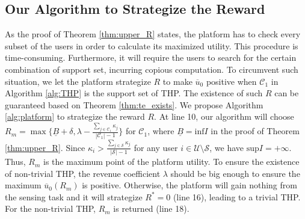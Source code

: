 \documentclass{IEEEtran}
\begin{document}
\subsection{Our Algorithm to Strategize the Reward}
As the proof of Theorem \ref{thm:upper_R} states, the platform has to check every subset of the users in order to calculate its maximized utility. This procedure is time-consuming. Furthermore, it will require the users to search for the certain combination of support set, incurring copious computation. To circumvent such situation, we let the platform strategize $R$ to make $\overline{u}_0$ positive when $\mathcal{C}_1$ in Algorithm \ref{alg:THP} is the support set of THP. The existence of such $R$ can be guaranteed based on Theorem \ref{thm:te_exists}. We propose Algorithm \ref{alg:platform} to strategize the reward $R$. At line 10, our algorithm will choose $R_m=\max\{\underline{B}+\delta,\lambda-\frac{\sum_{j\in\mathcal{C}_1}\kappa_j}{|\mathcal{C}_1|-1}\}$ for $\mathcal{C}_1$, where $\underline{B}=\mathrm{inf}I$ in the proof of Theorem \ref{thm:upper_R}. Since $\kappa_i>\frac{\sum_{j\in\mathcal{S}}\kappa_j}{|\mathcal{S}|-1}$ for any user $i\in\mathcal{U}\setminus\mathcal{S}$, we have $\mathrm{sup}I=+\infty$. Thus, $R_m$ is the maximum point of the platform utility. To ensure the existence of non-trivial THP, the revenue coefficient $\lambda$ should be big enough to ensure the maximum $\overline{u}_0(R_m)$ is positive. Otherwise, the platform will gain nothing from the sensing task and it will strategize $R^*=0$ (line 16), leading to a trivial THP. For the non-trivial THP, $R_m$ is returned (line 18).
\end{document}
